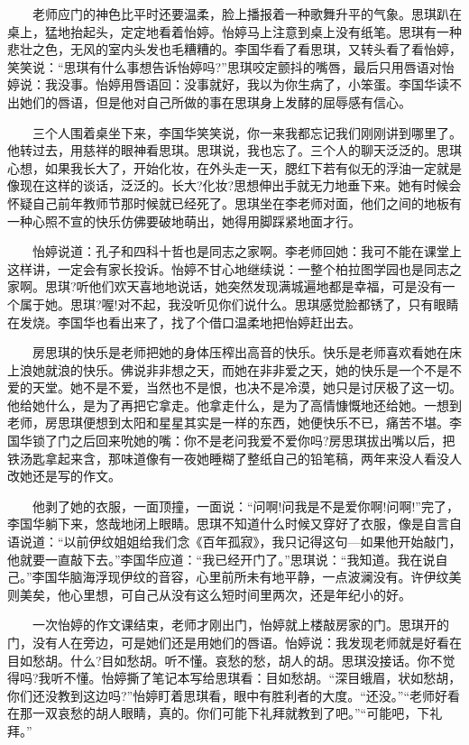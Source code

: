 \documentclass[12pt,UTF8]{ctexbook}
\begin{document}
　　老师应门的神色比平时还要温柔，脸上播报着一种歌舞升平的气象。思琪趴在桌上，猛地抬起头，定定地看着怡婷。怡婷马上注意到桌上没有纸笔。思琪有一种悲壮之色，无风的室内头发也毛糟糟的。李国华看了看思琪，又转头看了看怡婷，笑笑说：\enquote{思琪有什么事想告诉怡婷吗?}思琪咬定颤抖的嘴唇，最后只用唇语对怡婷说：我没事。怡婷用唇语回：没事就好，我以为你生病了，小笨蛋。李国华读不出她们的唇语，但是他对自己所做的事在思琪身上发酵的屈辱感有信心。

　　三个人围着桌坐下来，李国华笑笑说，你一来我都忘记我们刚刚讲到哪里了。他转过去，用慈祥的眼神看思琪。思琪说，我也忘了。三个人的聊天泛泛的。思琪心想，如果我长大了，开始化妆，在外头走一天，腮红下若有似无的浮油一定就是像现在这样的谈话，泛泛的。长大?化妆?思想伸出手就无力地垂下来。她有时候会怀疑自己前年教师节那时候就已经死了。思琪坐在李老师对面，他们之间的地板有一种心照不宣的快乐仿佛要破地萌出，她得用脚踩紧地面才行。

　　怡婷说道：孔子和四科十哲也是同志之家啊。李老师回她：我可不能在课堂上这样讲，一定会有家长投诉。怡婷不甘心地继续说：一整个柏拉图学园也是同志之家啊。思琪?听他们欢天喜地地说话，她突然发现满城遍地都是幸福，可是没有一个属于她。思琪?喔!对不起，我没听见你们说什么。思琪感觉脸都锈了，只有眼睛在发烧。李国华也看出来了，找了个借口温柔地把怡婷赶出去。

　　房思琪的快乐是老师把她的身体压榨出高音的快乐。快乐是老师喜欢看她在床上浪她就浪的快乐。佛说非非想之天，而她在非非爱之天，她的快乐是一个不是不爱的天堂。她不是不爱，当然也不是恨，也决不是冷漠，她只是讨厌极了这一切。他给她什么，是为了再把它拿走。他拿走什么，是为了高情慷慨地还给她。一想到老师，房思琪便想到太阳和星星其实是一样的东西，她便快乐不已，痛苦不堪。李国华锁了门之后回来吮她的嘴：你不是老问我爱不爱你吗?房思琪拔出嘴以后，把铁汤匙拿起来含，那味道像有一夜她睡糊了整纸自己的铅笔稿，两年来没人看没人改她还是写的作文。

　　他剥了她的衣服，一面顶撞，一面说：\enquote{问啊!问我是不是爱你啊!问啊!}完了，李国华躺下来，悠哉地闭上眼睛。思琪不知道什么时候又穿好了衣服，像是自言自语说道：\enquote{以前伊纹姐姐给我们念《百年孤寂》，我只记得这句---如果他开始敲门，他就要一直敲下去。}李国华应道：\enquote{我已经开门了。}思琪说：\enquote{我知道。我在说自己。}李国华脑海浮现伊纹的音容，心里前所未有地平静，一点波澜没有。许伊纹美则美矣，他心里想，可自己从没有这么短时间里两次，还是年纪小的好。

　　一次怡婷的作文课结束，老师才刚出门，怡婷就上楼敲房家的门。思琪开的门，没有人在旁边，可是她们还是用她们的唇语。怡婷说：我发现老师就是好看在目如愁胡。什么?目如愁胡。听不懂。哀愁的愁，胡人的胡。思琪没接话。你不觉得吗?我听不懂。怡婷撕了笔记本写给思琪看：目如愁胡。\enquote{深目蛾眉，状如愁胡，你们还没教到这边吗?}怡婷盯着思琪看，眼中有胜利者的大度。\enquote{还没。}\enquote{老师好看在那一双哀愁的胡人眼睛，真的。你们可能下礼拜就教到了吧。}\enquote{可能吧，下礼拜。}
\end{document}
